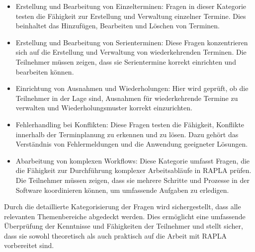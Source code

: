 \begin{enumerate}
\begin{itemize}
        \item Erstellung und Bearbeitung von Einzelterminen: Fragen in dieser Kategorie testen die Fähigkeit zur Erstellung und Verwaltung einzelner Termine. Dies beinhaltet das Hinzufügen, Bearbeiten und Löschen von Terminen.

        \item Erstellung und Bearbeitung von Serienterminen: Diese Fragen konzentrieren sich auf die Erstellung und Verwaltung von wiederkehrenden Terminen. Die Teilnehmer müssen zeigen, dass sie Serientermine korrekt einrichten und bearbeiten können.

        \item Einrichtung von Ausnahmen und Wiederholungen: Hier wird geprüft, ob die Teilnehmer in der Lage sind, Ausnahmen für wiederkehrende Termine zu verwalten und Wiederholungsmuster korrekt einzurichten.

        \item Fehlerhandling bei Konflikten: Diese Fragen testen die Fähigkeit, Konflikte innerhalb der Terminplanung zu erkennen und zu lösen. Dazu gehört das Verständnis von Fehlermeldungen und die Anwendung geeigneter Lösungen.

        \item Abarbeitung von komplexen Workflows: Diese Kategorie umfasst Fragen, die die Fähigkeit zur Durchführung komplexer Arbeitsabläufe in RAPLA prüfen. Die Teilnehmer müssen zeigen, dass sie mehrere Schritte und Prozesse in der Software koordinieren können, um umfassende Aufgaben zu erledigen.
    \end{itemize}
\end{enumerate}
Durch die detaillierte Kategorisierung der Fragen wird sichergestellt, dass alle relevanten Themenbereiche abgedeckt werden. Dies ermöglicht eine umfassende Überprüfung der Kenntnisse und Fähigkeiten der Teilnehmer und stellt sicher, dass sie sowohl theoretisch als auch praktisch auf die Arbeit mit RAPLA vorbereitet sind.

